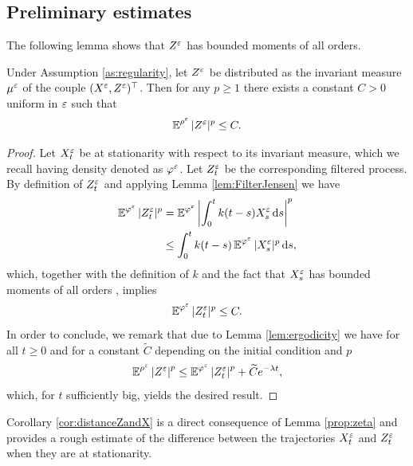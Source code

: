 \documentclass[10pt]{article}
\begin{document}
\begin{appendices}
\subsection{Preliminary estimates}

The following lemma shows that $Z^\varepsilon$ has bounded moments of all orders.
\begin{lemma} \label{lem:bounded_momentZ}
	Under Assumption \ref{as:regularity}, let $Z^\varepsilon$ be distributed as the invariant measure $\mu^\varepsilon$ of the couple $(X^\varepsilon, Z^\varepsilon)^\top$. Then for any $p \geq 1$ there exists a constant $C > 0$ uniform in $\varepsilon$ such that 
	\begin{equation}
	\operatorname{\mathbb{E}}^{\rho^\varepsilon}|Z^\varepsilon|^p \le C.
	\end{equation}
\end{lemma}
\begin{proof} Let $X_t^\varepsilon$ be at stationarity with respect to its invariant measure, which we recall having density denoted as $\varphi^\varepsilon$. Let $Z_t^\varepsilon$ be the corresponding filtered process. By definition of $Z^\varepsilon_t$ and applying Lemma \ref{lem:FilterJensen} we have
	\begin{equation}
	\begin{aligned}
	\operatorname{\mathbb{E}}^{\varphi^\varepsilon} |Z_t^\varepsilon|^p &= \operatorname{\mathbb{E}}^{\varphi^\varepsilon} \left| \int_0^t k(t-s) X_s^\varepsilon \,\mathrm{d} s \right|^p \\
	&\leq \int_0^t k(t - s) \operatorname{\mathbb{E}}^{\varphi^\varepsilon} |X_s^\varepsilon|^p \,\mathrm{d} s,
	\end{aligned}
	\end{equation}
	which, together with the definition of $k$ and the fact that $X_s^\varepsilon$ has bounded moments of all orders \cite[Corollary 5.4]{PaS07}, implies
	\begin{equation}
	\operatorname{\mathbb{E}}^{\varphi^\varepsilon}|Z_t^\varepsilon|^p \le C.
	\end{equation}
	In order to conclude, we remark that due to Lemma \ref{lem:ergodicity} we have for all $t \geq 0$ and for a constant $\widetilde C$ depending on the initial condition and $p$  
	\begin{equation}
	\operatorname{\mathbb{E}}^{\rho^\varepsilon} \left\lvert Z^\varepsilon\right\rvert^p \leq \operatorname{\mathbb{E}}^{\varphi^\varepsilon}\left\lvert Z_t^\varepsilon\right\rvert^p + \widetilde C e^{-\lambda t},
	\end{equation}
	which, for $t$ sufficiently big, yields the desired result.
\end{proof}


Corollary \ref{cor:distanceZandX} is a direct consequence of Lemma \ref{prop:zeta} and provides a rough estimate of the difference between the trajectories $X_t^\varepsilon$ and $Z_t^\varepsilon$ when they are at stationarity.


\end{appendices}
\end{document}
